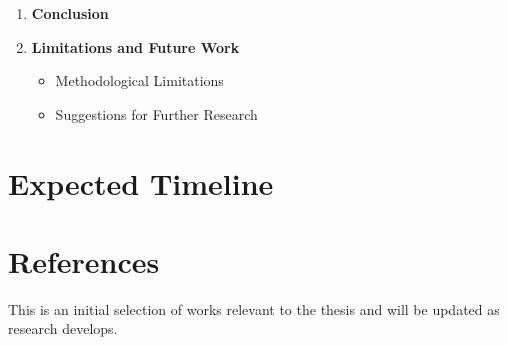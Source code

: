 \documentclass[oneside, paper=A4, DIV=15]{scrartcl}
\begin{document}
\begin{enumerate}
  \item \textbf{Conclusion}

  \item \textbf{Limitations and Future Work}
    \begin{itemize}
      \item Methodological Limitations
      \item Suggestions for Further Research
    \end{itemize}
\end{enumerate}


\section{Expected Timeline}




 
\section{References}\label{sec:References}
This is an initial selection of works relevant to the thesis and will be updated as research develops.
\printbibliography[heading=none]

\begin{center}
\end{center}
\end{document}
